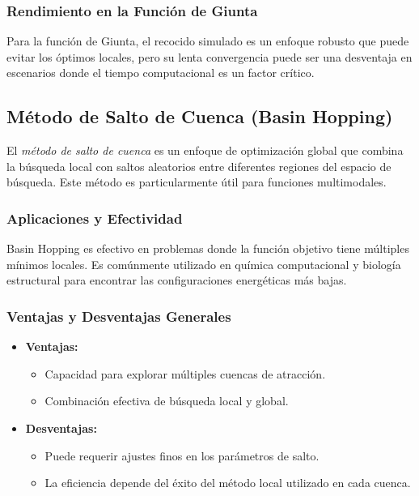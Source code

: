 \documentclass[fontsize=10pt]{article}
\begin{document}
\subsubsection{Rendimiento en la Función de Giunta}

Para la función de Giunta, el recocido simulado es un enfoque robusto que puede evitar los óptimos locales, pero su lenta convergencia puede ser una desventaja en escenarios donde el tiempo computacional es un factor crítico.

\subsection{Método de Salto de Cuenca (Basin Hopping)}

El \textit{método de salto de cuenca} es un enfoque de optimización global que combina la búsqueda local con saltos aleatorios entre diferentes regiones del espacio de búsqueda. Este método es particularmente útil para funciones multimodales.

\subsubsection{Aplicaciones y Efectividad}

Basin Hopping es efectivo en problemas donde la función objetivo tiene múltiples mínimos locales. Es comúnmente utilizado en química computacional y biología estructural para encontrar las configuraciones energéticas más bajas.

\subsubsection{Ventajas y Desventajas Generales}

\begin{itemize}
    \item \textbf{Ventajas:} 
    \begin{itemize}
        \item Capacidad para explorar múltiples cuencas de atracción.
        \item Combinación efectiva de búsqueda local y global.
    \end{itemize}
    \item \textbf{Desventajas:} 
    \begin{itemize}
        \item Puede requerir ajustes finos en los parámetros de salto.
        \item La eficiencia depende del éxito del método local utilizado en cada cuenca.
    \end{itemize}
\end{itemize}
\end{document}
